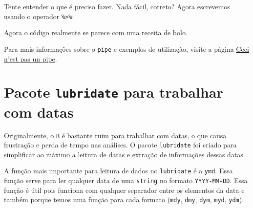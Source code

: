 \documentclass[]{book}
\newenvironment{Shaded}{\begin{snugshade}}{\end{snugshade}}
\newcommand{\KeywordTok}[1]{\textcolor[rgb]{0.13,0.29,0.53}{\textbf{{#1}}}}
\newcommand{\DataTypeTok}[1]{\textcolor[rgb]{0.13,0.29,0.53}{{#1}}}
\newcommand{\DecValTok}[1]{\textcolor[rgb]{0.00,0.00,0.81}{{#1}}}
\newcommand{\StringTok}[1]{\textcolor[rgb]{0.31,0.60,0.02}{{#1}}}
\newcommand{\NormalTok}[1]{{#1}}
\begin{document}
Tente entender o que é preciso fazer. Nada fácil, correto? Agora
escrevemos usando o operador \texttt{\%\textgreater{}\%}:

\begin{Shaded}
\end{Shaded}

Agora o código realmente se parece com uma receita de bolo.

Para mais informações sobre o \texttt{pipe} e exemplos de utilização,
visite a página
\href{http://cran.r-project.org/web/packages/magrittr/vignettes/magrittr.html}{Ceci
n'est pas un pipe}.

\section{\texorpdfstring{Pacote \texttt{lubridate} para trabalhar com
datas}{Pacote lubridate para trabalhar com datas}}\label{pacote-lubridate-para-trabalhar-com-datas}

Originalmente, o \texttt{R} é bastante ruim para trabalhar com datas, o
que causa frustração e perda de tempo nas análises. O pacote
\texttt{lubridate} foi criado para simplificar ao máximo a leitura de
datas e extração de informações dessas datas.

A função mais importante para leitura de dados no \texttt{lubridate} é a
\texttt{ymd}. Essa função serve para ler qualquer data de uma
\texttt{string} no formato \texttt{YYYY-MM-DD}. Essa função é útil pois
funciona com qualquer separador entre os elementos da data e também
porque temos uma função para cada formato (\texttt{mdy}, \texttt{dmy},
\texttt{dym}, \texttt{myd}, \texttt{ydm}).
\end{document}
